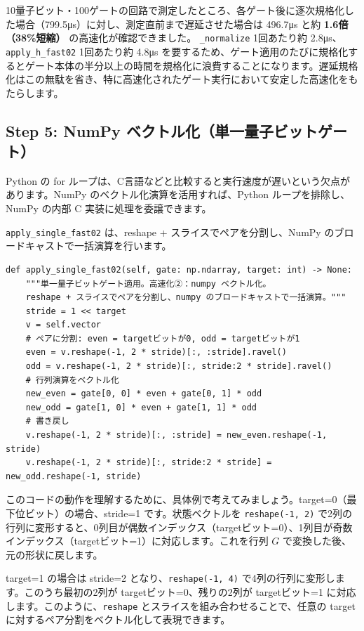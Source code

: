10量子ビット・100ゲートの回路で測定したところ、各ゲート後に逐次規格化した場合（799.5μs）に対し、測定直前まで遅延させた場合は 496.7μs と約 \textbf{1.6倍（38\%短縮）} の高速化が確認できました。
\texttt{\_normalize} 1回あたり約 2.8μs、\texttt{apply\_h\_fast02} 1回あたり約 4.8μs を要するため、ゲート適用のたびに規格化するとゲート本体の半分以上の時間を規格化に浪費することになります。遅延規格化はこの無駄を省き、特に高速化されたゲート実行において安定した高速化をもたらします。

\subsection{Step 5: NumPy ベクトル化（単一量子ビットゲート）}

Python の for ループは、C言語などと比較すると実行速度が遅いという欠点があります。NumPy のベクトル化演算を活用すれば、Python ループを排除し、NumPy の内部 C 実装に処理を委譲できます。

\texttt{apply\_single\_fast02} は、reshape + スライスでペアを分割し、NumPy のブロードキャストで一括演算を行います。

\begin{lstlisting}[caption=apply\_single\_fast02：NumPy ベクトル化（qubit.py）, label=src:apply_single_fast02]
def apply_single_fast02(self, gate: np.ndarray, target: int) -> None:
    """単一量子ビットゲート適用。高速化②：numpy ベクトル化。
    reshape + スライスでペアを分割し、numpy のブロードキャストで一括演算。"""
    stride = 1 << target
    v = self.vector
    # ペアに分割: even = targetビットが0, odd = targetビットが1
    even = v.reshape(-1, 2 * stride)[:, :stride].ravel()
    odd = v.reshape(-1, 2 * stride)[:, stride:2 * stride].ravel()
    # 行列演算をベクトル化
    new_even = gate[0, 0] * even + gate[0, 1] * odd
    new_odd = gate[1, 0] * even + gate[1, 1] * odd
    # 書き戻し
    v.reshape(-1, 2 * stride)[:, :stride] = new_even.reshape(-1, stride)
    v.reshape(-1, 2 * stride)[:, stride:2 * stride] = new_odd.reshape(-1, stride)
\end{lstlisting}

このコードの動作を理解するために、具体例で考えてみましょう。target=0（最下位ビット）の場合、stride=1 です。状態ベクトルを \texttt{reshape(-1, 2)} で2列の行列に変形すると、0列目が偶数インデックス（targetビット=0）、1列目が奇数インデックス（targetビット=1）に対応します。これを行列 $G$ で変換した後、元の形状に戻します。

target=1 の場合は stride=2 となり、\texttt{reshape(-1, 4)} で4列の行列に変形します。このうち最初の2列が targetビット=0、残りの2列が targetビット=1 に対応します。このように、\texttt{reshape} とスライスを組み合わせることで、任意の target に対するペア分割をベクトル化して表現できます。

